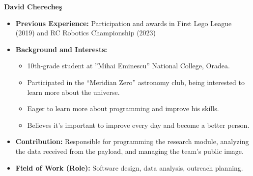 \item[] \textbf{David Chereche\c{s}}
    \begin{itemize}[label=]
        \item[\faCogs] \textbf{Previous Experience:} Participation and awards in First Lego League (2019) and RC Robotics Championship (2023)
        \item[\faGraduationCap] \textbf{Background and Interests:} 
        \begin{itemize}[label=\textbullet]
            \item 10th-grade student at ”Mihai Eminescu” National College, Oradea.
            \item Participated in the “Meridian Zero” astronomy club, being interested to learn more about the universe.
            \item Eager to learn more about programming and improve his skills.
            \item Believes it’s important to improve every day and become a better person.
        \end{itemize}
        \item[\faEdit] \textbf{Contribution:} Responsible for programming the research module, analyzing the data received from the payload, and managing the team’s public image.
        \item[\faMicroscope] \textbf{Field of Work (Role):} Software design, data analysis, outreach planning.
    \end{itemize}
    \vspace{0.2 cm}
    